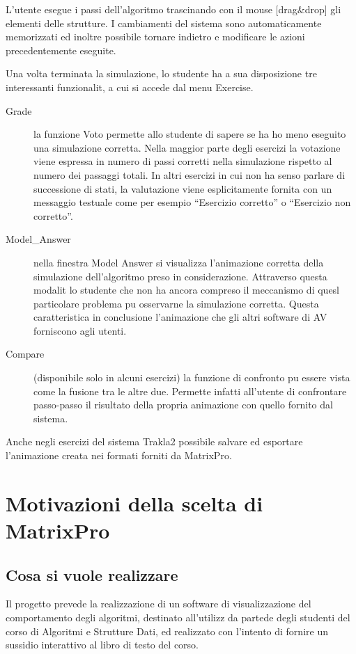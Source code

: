 L'utente esegue i passi dell'algoritmo trascinando con il mouse {[}drag\&drop{]}
gli elementi delle strutture. I cambiamenti del sistema sono automaticamente
memorizzati ed  inoltre possibile tornare indietro e modificare le
azioni precedentemente eseguite.

Una volta terminata la simulazione, lo studente ha a sua disposizione
tre interessanti funzionalit, a cui si accede dal menu Exercise.
\begin{description}
\item [{Grade}] la funzione Voto permette allo studente di sapere se ha
ho meno eseguito una simulazione corretta. Nella maggior parte degli
esercizi la votazione viene espressa in numero di passi corretti nella
simulazione rispetto al numero dei passaggi totali. In altri esercizi
in cui non ha senso parlare di successione di stati, la valutazione
viene esplicitamente fornita con un messaggio testuale come per esempio
{}``Esercizio corretto'' o {}``Esercizio non corretto''.
\item [{Model\_Answer}] nella finestra Model Answer si visualizza l'animazione
corretta della simulazione dell'algoritmo preso in considerazione.
Attraverso questa modalit lo studente che non ha ancora compreso
il meccanismo di quesl particolare problema pu osservarne la simulazione
corretta. Questa caratteristica in conclusione  l'animazione che
gli altri software di AV forniscono agli utenti.
\item [{Compare}] (disponibile solo in alcuni esercizi) la funzione di
confronto pu essere vista come la fusione tra le altre due. Permette
infatti all'utente di confrontare passo-passo il risultato della propria
animazione con quello fornito dal sistema.
\end{description}
Anche negli esercizi del sistema Trakla2  possibile salvare ed esportare
l'animazione creata nei formati forniti da MatrixPro.


\section{Motivazioni della scelta di MatrixPro}


\subsection{Cosa si vuole realizzare}

Il progetto prevede la realizzazione di un software di visualizzazione
del comportamento degli algoritmi, destinato all'utilizz da partede
degli studenti del corso di Algoritmi e Strutture Dati, ed  realizzato
con l'intento di fornire un sussidio interattivo al libro di testo
del corso.

